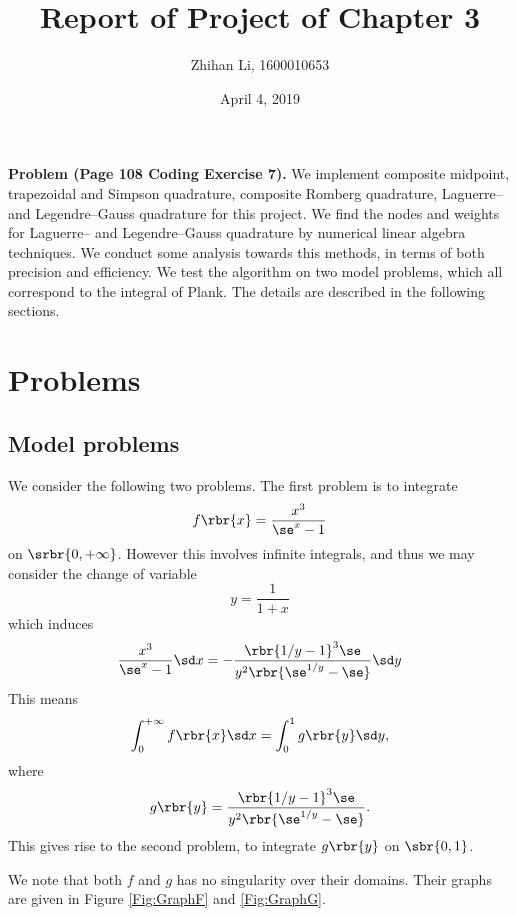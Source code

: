 \documentclass[english, nochinese]{pnote}
\title{Report of Project of Chapter 3}
\author{Zhihan Li, 1600010653}
\date{April 4, 2019}
\begin{document}
\maketitle

\textbf{Problem (Page 108 Coding Exercise 7).} We implement composite midpoint, trapezoidal and Simpson quadrature, composite Romberg quadrature, Laguerre-- and Legendre--Gauss quadrature for this project. We find the nodes and weights for Laguerre-- and Legendre--Gauss quadrature by numerical linear algebra techniques. We conduct some analysis towards this methods, in terms of both precision and efficiency. We test the algorithm on two model problems, which all correspond to the integral of Plank. The details are described in the following sections.

\section{Problems}

\subsection{Model problems}

We consider the following two problems. The first problem is to integrate
\begin{equation}
f \rbr{x} = \frac{x^3}{ \se^x - 1 }
\end{equation}
on $ \srbr{ 0, +\infty } $. However this involves infinite integrals, and thus we may consider the change of variable
\begin{equation}
y = \frac{1}{ 1 + x }
\end{equation}
which induces
\begin{equation}
\frac{x^3}{ \se^x - 1 } \sd x = - \frac{ \rbr{ 1 / y - 1 }^3 \se }{ y^2 \rbr{ \se^{ 1 / y } - \se } } \sd y
\end{equation}
This means
\begin{equation}
\int_0^{+\infty} f \rbr{x} \sd x = \int_0^1 g \rbr{y} \sd y,
\end{equation}
where
\begin{equation}
g \rbr{y} = \frac{ \rbr{ 1 / y - 1 }^3 \se }{ y^2 \rbr{ \se^{ 1 / y } - \se } }.
\end{equation}
This gives rise to the second problem, to integrate $ g \rbr{y} $ on $ \sbr{ 0, 1 } $.

We note that both $f$ and $g$ has no singularity over their domains. Their graphs are given in Figure \ref{Fig:GraphF} and \ref{Fig:GraphG}.
\end{document}
